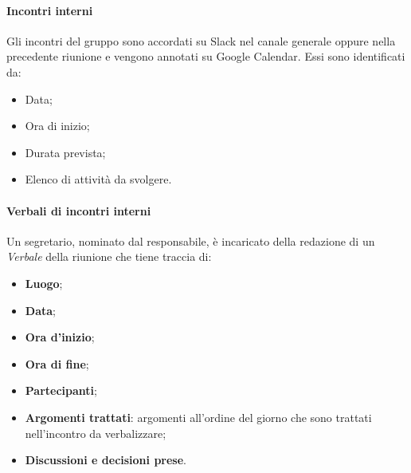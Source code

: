 			\paragraph*{Incontri interni}
				Gli incontri del gruppo sono accordati su Slack nel canale generale oppure nella precedente riunione e vengono annotati su Google Calendar. Essi sono identificati da:
				\begin{itemize}
					\item Data;
					\item Ora di inizio;
					\item Durata prevista;
					\item Elenco di attività da svolgere.
				\end{itemize}
			\paragraph*{Verbali di incontri interni}
				Un segretario, nominato dal responsabile, è incaricato della redazione di un \textit{Verbale} della riunione che tiene traccia di:
				\begin{itemize}
					\item \textbf{Luogo};
					\item \textbf{Data};
					\item \textbf{Ora d'inizio};
					\item \textbf{Ora di fine};
					\item \textbf{Partecipanti};
					\item \textbf{Argomenti trattati}: argomenti all'ordine del giorno che sono trattati nell'incontro da verbalizzare;
					\item \textbf{Discussioni e decisioni prese}.
				\end{itemize}
